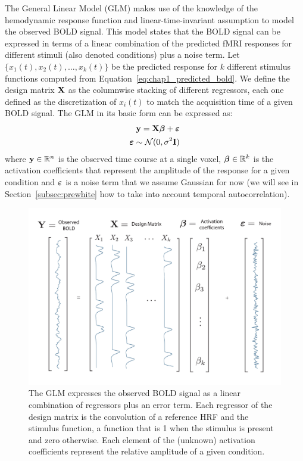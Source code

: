 The General Linear Model (\gls{GLM}) makes use of the knowledge of the hemodynamic response function and linear-time-invariant assumption to model the observed BOLD signal. This model states that the BOLD signal can be expressed in terms of a linear combination of the predicted fMRI responses for different stimuli (also denoted \gls{conditions}) plus a noise term. Let $\{x_1(t), x_2(t), \ldots, x_k(t)\}$ be the predicted response for $k$ different stimulus functions computed from Equation~\eqref{eq:chap1_predicted_bold}. We define the design matrix $\mathbf{X}$ as the columnwise stacking of different regressors, each one defined as the discretization of $x_i(t)$ to match the acquisition time of a given BOLD signal. The GLM in its basic form can be expressed as:
\begin{equation}
\begin{aligned}
\B{y} = \B{X}\bfbeta + \bvarepsilon \\
\bvarepsilon \sim \mathcal{N}(0, \sigma^2 \B{I})
\end{aligned}
\label{eq:chapter_1_glm}
\end{equation}
where $\mathbf{y} \in {\mathbb R}^n$ is the observed time course at a single voxel, ${\boldsymbol \beta} \in {\mathbb R}^k$ is the activation coefficients that represent the amplitude of the response for a given condition and ${\boldsymbol \varepsilon}$ is a noise term that we assume Gaussian for now (we will see in Section~\ref{subsec:prewhite} how to take into account temporal autocorrelation). 
\begin{figure}[t]
\center \includegraphics[width=.8\linewidth]{figures/chapter_1/glm_plain.pdf}
\caption{The GLM expresses the observed BOLD signal as a linear combination of regressors plus an error term. Each regressor of the design matrix is the convolution of a reference HRF and the stimulus function, a function that is 1 when the stimulus is present and zero otherwise. Each element of the (unknown) activation coefficients represent the relative amplitude of a given condition.}\label{fig:glm1}
\end{figure}


